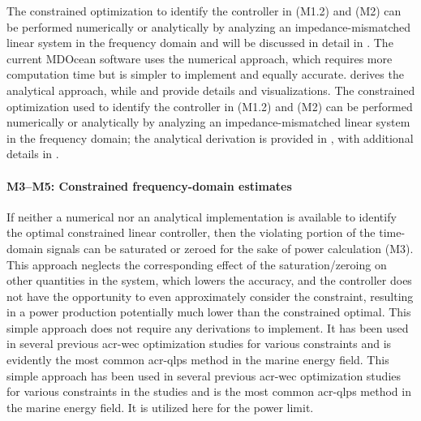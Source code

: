 \ifdefined\DISSERTATION
    The constrained optimization to identify the controller in (M1.2) and (M2) can be performed numerically or analytically by analyzing an impedance-mismatched linear system in the frequency domain and will be discussed in detail in .
    The current MDOcean software uses the numerical approach, which requires more computation time but is simpler to implement and equally accurate.
     derives the analytical approach, while \citet{mccabe_force-limited_2024} and  provide details and visualizations.
\else
    The constrained optimization used to identify the controller in (M1.2) and (M2) can be performed numerically or analytically by analyzing an impedance-mismatched linear system in the frequency domain;
    the analytical derivation is provided in , with additional details in .
\fi

\paragraph{M3--M5: Constrained frequency-domain estimates}
If neither a numerical nor an analytical implementation is available to identify the optimal constrained linear controller, then the violating portion of the time-domain signals can be saturated or zeroed for the sake of power calculation (M3).
This approach neglects the corresponding effect of the saturation/zeroing on other quantities in the system, which lowers the accuracy, and the controller does not have the opportunity to even approximately consider the constraint, resulting in a power production potentially much lower than the constrained optimal.
\ifdefined\DISSERTATION
    This simple approach does not require any derivations to implement.
    It has been used in several previous \gls{acr-wec} optimization studies for various constraints \citep{garcia-teruel_design_2022,garcia-teruel_reliability-based_2021,cotten_multi-objective_2022,mccabe_constrained_2013} and is evidently the most common \gls{acr-qlps} method in the marine energy field.
\else
    This simple approach has been used in several previous \gls{acr-wec} optimization studies for various constraints in the studies \citep{garcia-teruel_design_2022,garcia-teruel_reliability-based_2021,cotten_multi-objective_2022,mccabe_constrained_2013}
    and is the most common \gls{acr-qlps} method in the marine energy field.
\fi
It is utilized here for the power limit.

